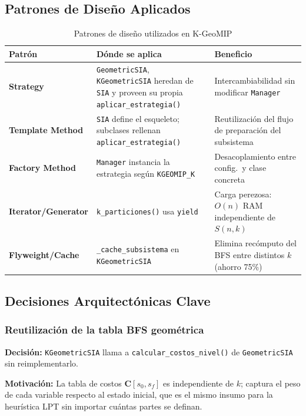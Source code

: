 \documentclass[12pt,letterpaper]{article}
\theoremstyle{definition}
\theoremstyle{remark}
\newcommand{\Stir}[2]{S(#1,#2)}
\begin{document}
\subsection{Patrones de Diseño Aplicados}

\begin{table}[H]
\centering
\caption{Patrones de diseño utilizados en K-GeoMIP}
\label{tab:patrones}
\begin{tabular}{@{}l p{4.2cm} p{5cm}@{}}
\toprule
\textbf{Patrón} & \textbf{Dónde se aplica} & \textbf{Beneficio} \\
\midrule
\textbf{Strategy} &
  \texttt{GeometricSIA}, \texttt{KGeometricSIA} heredan de \texttt{SIA} y
  proveen su propia \texttt{aplicar\_estrategia()} &
  Intercambiabilidad sin modificar \texttt{Manager} \\[4pt]
\textbf{Template Method} &
  \texttt{SIA} define el esqueleto; subclases rellenan \texttt{aplicar\_estrategia()} &
  Reutilización del flujo de preparación del subsistema \\[4pt]
\textbf{Factory Method} &
  \texttt{Manager} instancia la estrategia según \texttt{KGEOMIP\_K} &
  Desacoplamiento entre config.\ y clase concreta \\[4pt]
\textbf{Iterator/Generator} &
  \texttt{k\_particiones()} usa \texttt{yield} &
  Carga perezosa: $O(n)$ RAM independiente de $\Stir{n}{k}$ \\[4pt]
\textbf{Flyweight/Cache} &
  \texttt{\_cache\_subsistema} en \texttt{KGeometricSIA} &
  Elimina recómputo del BFS entre distintos $k$ (ahorro 75\%) \\
\bottomrule
\end{tabular}
\end{table}

\subsection{Decisiones Arquitectónicas Clave}

\subsubsection{Reutilización de la tabla BFS geométrica}
\textbf{Decisión:} \texttt{KGeometricSIA} llama a \texttt{calcular\_costos\_nivel()} de
\texttt{GeometricSIA} sin reimplementarlo.

\textbf{Motivación:} La tabla de costos $\mathbf{C}[s_0, s_f]$ es independiente de $k$;
captura el peso de cada variable respecto al estado inicial, que es el mismo insumo para
la heurística LPT sin importar cuántas partes se definan.
\end{document}
